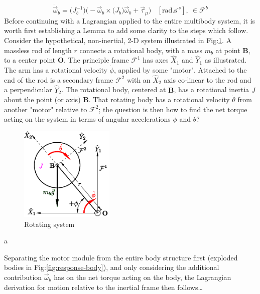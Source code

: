 \begin{equation}
\dot{\vec{\omega}}_b=\big(J_b^{-1}\big)\Big(-\vec{\omega}_b\times\big(J_b\big)\vec{\omega}_b+\vec{\tau}_{\mu}\Big)~~~~[\text{rad.s}^{\text{-}s}],~\in\mathcal{F}^b
\end{equation}
Before continuing with a Lagrangian applied to the entire multibody system, it is worth first establishing a Lemma to add some clarity to the steps which follow. Consider the hypothetical, non-inertial, 2-D system illustrated in Fig:\ref{fig:lemma-1}. A massless rod of length $r$ connects a rotational body, with a mass $m_b$ at point $\mathbf{B}$, to a center point $\mathbf{O}$. The principle frame $\mathcal{F}^{1}$ has axes $\hat{X}_1$ and $\hat{Y}_1$ as illustrated. The arm has a rotational velocity $\dot{\phi}$, applied by some "motor". Attached to the end of the rod is a secondary frame $\mathcal{F}^2$ with an $\hat{X}_2$ axis co-linear to the rod and a perpendicular $\hat{Y}_2$. The rotational body, centered at $\mathbf{B}$, has a rotational inertia $J$ about the point (or axis) $\mathbf{B}$. That rotating body has a rotational velocity $\dot{\theta}$ from another "motor" relative to $\mathcal{F}^2$; the question is then how to find the net torque acting on the system in terms of angular accelerations $\ddot{\phi}$ and $\ddot{\theta}$?
\begin{figure}[htbp]
\centering
\includegraphics[width=0.4\textwidth]{figs/lemma-1}
\caption{Rotating system}
\label{fig:lemma-1}
\end{figure} 
\par
a
\par
Separating the motor module from the entire body structure first (exploded bodies in Fig:\ref{fig:response-body}), and only considering the additional contribution $\vec{\omega}_b$ has on the net torque acting on the body, the Lagrangian  derivation for motion relative to the inertial frame then follows\ldots
